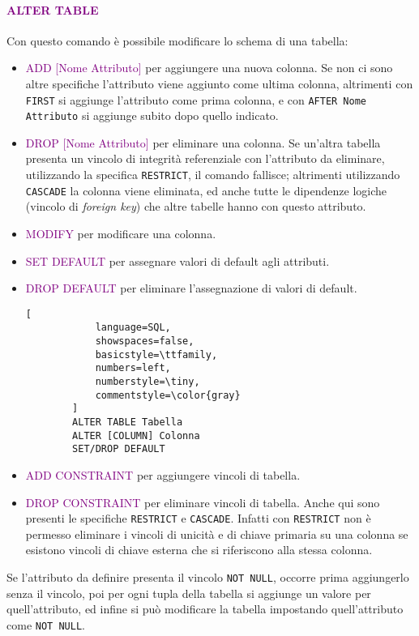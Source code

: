 \paragraph{\textcolor{purple}{ALTER TABLE}} Con questo comando è possibile modificare lo schema
di una tabella:
\begin{itemize}
    \item \textcolor{purple}{ADD [Nome Attributo]} per aggiungere una nuova colonna. Se non ci sono
        altre specifiche l'attributo viene aggiunto come ultima colonna, altrimenti con \verb|FIRST| si aggiunge l'attributo
        come prima colonna, e con \verb|AFTER Nome Attributo| si aggiunge subito dopo quello indicato. 
    \item \textcolor{purple}{DROP [Nome Attributo]} per eliminare una colonna. Se un'altra tabella presenta un vincolo di integrità
        referenziale con l'attributo da eliminare, utilizzando la specifica \verb|RESTRICT|, il comando fallisce; altrimenti
        utilizzando \verb|CASCADE| la colonna viene eliminata, ed anche tutte le dipendenze logiche (vincolo di \emph{foreign key}) che altre tabelle
        hanno con questo attributo. 
    \item \textcolor{purple}{MODIFY} per modificare una colonna.
    \item \textcolor{purple}{SET DEFAULT} per assegnare valori di default agli attributi.
    \item \textcolor{purple}{DROP DEFAULT} per eliminare l'assegnazione di valori di default.
         \begin{lstlisting}[
            language=SQL,
            showspaces=false,
            basicstyle=\ttfamily,
            numbers=left,
            numberstyle=\tiny,
            commentstyle=\color{gray}
        ]
        ALTER TABLE Tabella
        ALTER [COLUMN] Colonna
        SET/DROP DEFAULT
        \end{lstlisting}
    \item \textcolor{purple}{ADD CONSTRAINT} per aggiungere vincoli di tabella.
    \item \textcolor{purple}{DROP CONSTRAINT} per eliminare vincoli di tabella. Anche qui sono presenti
        le specifiche \verb|RESTRICT| e \verb|CASCADE|. Infatti con \verb|RESTRICT| non è permesso eliminare
        i vincoli di unicità e di chiave primaria su una colonna se esistono vincoli di chiave esterna che si riferiscono
        alla stessa colonna.
\end{itemize}

Se l'attributo da definire presenta il vincolo \verb|NOT NULL|, occorre prima aggiungerlo
senza il vincolo, poi per ogni tupla della tabella si aggiunge un valore per quell'attributo, ed
infine si può modificare la tabella impostando quell'attributo come \verb|NOT NULL|.

